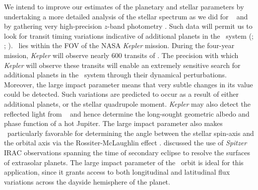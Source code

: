 We intend to improve our estimates of the planetary and stellar
parameters by undertaking a more detailed analysis of the stellar
spectrum as we did for \tresOne\
\citep{Sozzetti_Yong_Torres:apjl:2004a} and by gathering very
high-precision $z$-band photometry
\citep[e.g.,][]{Holman_Winn_Latham:apj:2006a}.  Such data will
permit us to look for transit timing variations indicative of
additional planets in the \tresTwo\ system
(\citealp{Agol_Steffen_Sari:mnras:2005a}; \citealp{Holman_Murray:Science:2005a}; \citealp{Steffen_Agol:mnras:2005a}). \tresTwo\ lies within the FOV of the NASA
\textit{Kepler} mission. During the four-year mission,
\textit{Kepler} will observe nearly 600 transits of \tresTwo. 
The precision with which \textit{Kepler} will observe these transits will
enable an extremely sensitive search for additional planets in the \tresTwo\
system through their dynamical perturbations.  Moreover, the large impact
parameter means that very subtle changes in its value could be detected.
Such variations are predicted \citep{Miralda-Escude:apj:2002a} to occur as a result
of either additional planets, or the stellar quadrupole moment. \textit{Kepler}
may also detect the reflected light from \tresTwo\ \citep{Jenkins_Doyle:apj:2003a}
and hence determine the long-sought geometric albedo and phase function of
a hot Jupiter. 
The large impact parameter also makes \tresTwo\ particularly
favorable for determining the angle between the stellar spin-axis and the
orbital axis via the Rossiter-McLaughlin effect 
\citep{Gaudi_Winn:apj:2007a}. 
\citet{Williams_Charbonneau_Cooper:apj:2006a} discussed
the use of {\it Spitzer} IRAC observations spanning the time of
secondary eclipse to resolve the surfaces of extrasolar planets.  The
large impact parameter of the \tresTwo\ orbit is ideal for this
application, since it grants access to both longitudinal and
latitudinal flux variations across the dayside hemisphere of the
planet.

